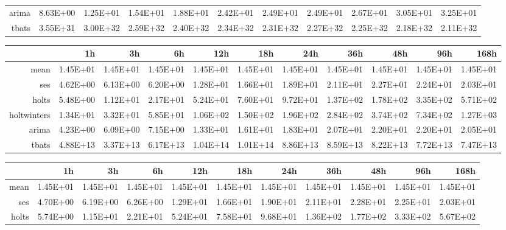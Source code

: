 \begin{landscape}
\begin{table}[ht]
\begin{tabular}{rrrrrrrrrrr}
  arima & 8.63E+00 & 1.25E+01 & 1.54E+01 & 1.88E+01 & 2.42E+01 & 2.49E+01 & 2.49E+01 & 2.67E+01 & 3.05E+01 & 3.25E+01 \\ 
  tbats & 3.55E+31 & 3.00E+32 & 2.59E+32 & 2.40E+32 & 2.34E+32 & 2.31E+32 & 2.27E+32 & 2.25E+32 & 2.18E+32 & 2.11E+32 \\ 
   \hline
\end{tabular}
\end{table}
\begin{table}[ht]
\centering
\begin{tabular}{rrrrrrrrrrr}
  \hline
 & 1h & 3h & 6h & 12h & 18h & 24h & 36h & 48h & 96h & 168h \\ 
  \hline
mean & 1.45E+01 & 1.45E+01 & 1.45E+01 & 1.45E+01 & 1.45E+01 & 1.45E+01 & 1.45E+01 & 1.45E+01 & 1.45E+01 & 1.45E+01 \\ 
  ses & 4.62E+00 & 6.13E+00 & 6.20E+00 & 1.28E+01 & 1.66E+01 & 1.89E+01 & 2.11E+01 & 2.27E+01 & 2.24E+01 & 2.03E+01 \\ 
  holts & 5.48E+00 & 1.12E+01 & 2.17E+01 & 5.24E+01 & 7.60E+01 & 9.72E+01 & 1.37E+02 & 1.78E+02 & 3.35E+02 & 5.71E+02 \\ 
  holtwinters & 1.34E+01 & 3.32E+01 & 5.85E+01 & 1.06E+02 & 1.50E+02 & 1.96E+02 & 2.84E+02 & 3.74E+02 & 7.34E+02 & 1.27E+03 \\ 
  arima & 4.23E+00 & 6.09E+00 & 7.15E+00 & 1.33E+01 & 1.61E+01 & 1.83E+01 & 2.07E+01 & 2.20E+01 & 2.20E+01 & 2.05E+01 \\ 
  tbats & 4.88E+13 & 3.37E+13 & 6.17E+13 & 1.04E+14 & 1.01E+14 & 8.86E+13 & 8.59E+13 & 8.22E+13 & 7.72E+13 & 7.47E+13 \\ 
   \hline
\end{tabular}
\end{table}
\begin{table}[ht]
\centering
\begin{tabular}{rrrrrrrrrrr}
  \hline
 & 1h & 3h & 6h & 12h & 18h & 24h & 36h & 48h & 96h & 168h \\ 
  \hline
mean & 1.45E+01 & 1.45E+01 & 1.45E+01 & 1.45E+01 & 1.45E+01 & 1.45E+01 & 1.45E+01 & 1.45E+01 & 1.45E+01 & 1.45E+01 \\ 
  ses & 4.70E+00 & 6.19E+00 & 6.26E+00 & 1.29E+01 & 1.66E+01 & 1.90E+01 & 2.11E+01 & 2.28E+01 & 2.25E+01 & 2.03E+01 \\ 
  holts & 5.74E+00 & 1.15E+01 & 2.21E+01 & 5.24E+01 & 7.58E+01 & 9.68E+01 & 1.36E+02 & 1.77E+02 & 3.33E+02 & 5.67E+02 \\ 

\end{tabular}
\end{table}
\end{landscape}
